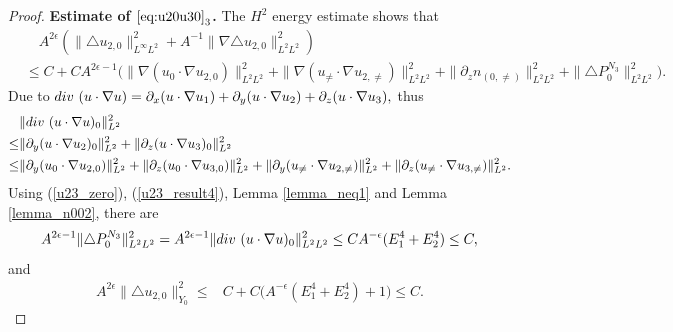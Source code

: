 \documentclass[12pt, reqno]{amsart}
\numberwithin{equation}{section}
\begin{document}
\begin{proof}
		{\bf Estimate of $\eqref{eq:u20u30}_3$.}
		The $H^2$ energy estimate shows that 
		\begin{equation}\label{u23_result3}
			\begin{aligned}
				&\quad A^{2\epsilon}(\|\triangle u_{2,0}\|^2_{L^{\infty}L^2}+A^{-1}
				\|\nabla \triangle u_{2,0}\|^2_{L^{2}L^2})\\ 
				&\leq C+C A^{2\epsilon-1}\Big(\|\nabla(u_0\cdot\nabla u_{2,0})\|^2_{L^2L^2}+\|\nabla(u_{\neq}\cdot\nabla u_{2,\neq})\|^2_{L^2L^2}+\|\partial_z n_{(0,\neq)}\|^2_{L^2L^2}+\|\triangle P^{N_3}_0\|^2_{L^2L^2}\Big).	
			\end{aligned}
		\end{equation}
		Due to ${\rm div}~(u\cdot\nabla u)=\partial_x(u\cdot\nabla u_{1})
		+\partial_y(u\cdot\nabla u_{2})+\partial_z(u\cdot\nabla u_{3}),$
		thus 
		\begin{equation}\label{u23_result4}
			\begin{aligned}
				&\|{\rm div}~(u\cdot\nabla u)_0\|_{L^2}^2\\\leq& 
				\|\partial_y(u\cdot\nabla u_{2})_0\|_{L^2}^2+\|\partial_z(u\cdot\nabla u_{3})_0\|_{L^2}^2\\
				\leq& \|\partial_y(u_0\cdot\nabla u_{2,0})\|_{L^2}^2
				+\|\partial_z(u_0\cdot\nabla u_{3,0})\|_{L^2}^2
				+\|\partial_y(u_{\neq}\cdot\nabla u_{2,\neq})\|_{L^2}^2
				+\|\partial_z(u_{\neq}\cdot\nabla u_{3,\neq})\|_{L^2}^2.
			\end{aligned}
		\end{equation}
		Using (\ref{u23_zero}), (\ref{u23_result4}), Lemma \ref{lemma_neq1} and Lemma \ref{lemma_n002},
		there are  
		\begin{equation}\label{u23_result41}
			A^{2\epsilon-1}\|\triangle P^{N_3}_0\|^2_{L^2L^2}=A^{2\epsilon-1}\|{\rm div}~(u\cdot\nabla u)_0\|_{L^2L^2}^2\leq  CA^{-\epsilon}(E_1^4+E_2^4)\leq C,
		\end{equation}
		and 
		\begin{equation*}\label{u23_result5}
			\begin{aligned}
				A^{2\epsilon}\|\triangle u_{2,0}\|^2_{Y_0}
				\leq&C+C\big(A^{-\epsilon}(E_1^4+E_2^4)+1\big)\leq C.
			\end{aligned}
		\end{equation*}
		

\end{proof}
\end{document}

